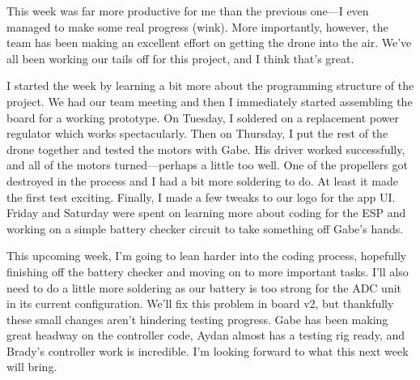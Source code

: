 \documentclass[12pt, titlepage]{article}
\begin{document}
This week was far more productive for me than the previous one---I even managed to make some real progress (wink). More importantly, however, the team has been making an excellent effort on getting the drone into the air. We've all been working our tails off for this project, and I think that's great.

I started the week by learning a bit more about the programming structure of the project. We had our team meeting and then I immediately started assembling the board for a working prototype. On Tuesday, I soldered on a replacement power regulator which works spectacularly. Then on Thursday, I put the rest of the drone together and tested the motors with Gabe. His driver worked successfully, and all of the motors turned---perhaps a little too well. One of the propellers got destroyed in the process and I had a bit more soldering to do. At least it made the first test exciting. Finally, I made a few tweaks to our logo for the app UI. Friday and Saturday were spent on learning more about coding for the ESP and working on a simple battery checker circuit to take something off Gabe's hands.

This upcoming week, I'm going to lean harder into the coding process, hopefully finishing off the battery checker and moving on to more important tasks. I'll also need to do a little more soldering as our battery is too strong for the ADC unit in its current configuration. We'll fix this problem in board v2, but thankfully these small changes aren't hindering testing progress. Gabe has been making great headway on the controller code, Aydan almost has a testing rig ready, and Brady's controller work is incredible. I'm looking forward to what this next week will bring.
\end{document}
